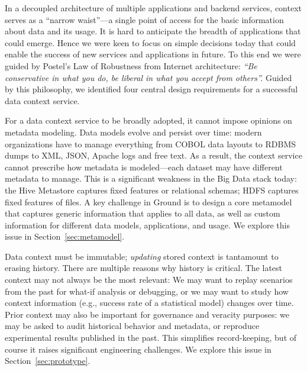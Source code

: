 \documentclass{sig-alternate}
\begin{document}
In a decoupled architecture of multiple applications and backend services, context serves as a ``narrow waist''---a single point of access for the basic information about data and its usage. It is hard to anticipate the breadth of applications that could emerge.
Hence we were keen to focus on simple decisions today that could enable the success of new services and applications in future. 
To this end we were guided by Postel's Law of Robustness from Internet architecture: \emph{``Be conservative in what you do, be liberal in what you accept from others''.}  
Guided by this philosophy, we identified four central design requirements for a successful data context service.

 For a data context service to be broadly adopted, it cannot impose opinions on metadata modeling. 
Data models evolve and persist over time: modern organizations have to manage everything from COBOL data layouts to RDBMS dumps to XML, JSON, Apache logs and free text. 
As a result, the context service cannot 
prescribe 
how metadata is modeled---each dataset may have different metadata to manage. 
This is a significant weakness in the Big Data stack today: the Hive Metastore captures fixed features or relational schemas; HDFS captures fixed features of files.  
A key challenge in Ground is to design a core metamodel that captures generic information that applies to all data, as well as custom information for different data models, applications, and usage.
We explore this issue in Section~\ref{sec:metamodel}.

 Data context must be immutable; \emph{updating} stored context is tantamount to erasing history. %
There are multiple reasons why history is critical. 
The latest context may not always be the most relevant: We may want to replay scenarios from the past for what-if analysis or debugging, or we may want to study how context information (e.g., success rate of a statistical model) changes over time.
Prior context may also be important for governance and veracity purposes: we may be asked to audit historical behavior and metadata, or reproduce experimental results published in the past. 
This simplifies record-keeping, but of course it raises significant engineering challenges.  
We explore this issue in Section~\ref{sec:prototype}.
\end{document}
